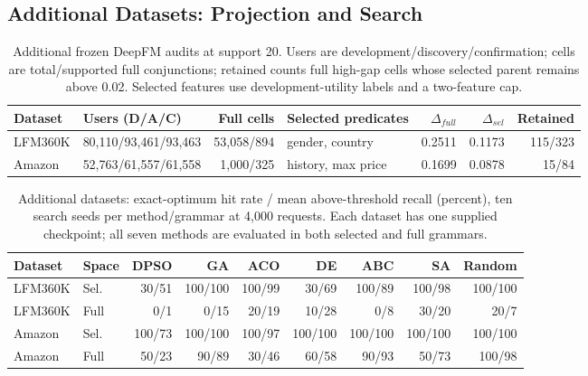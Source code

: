 \documentclass[sigconf,nonacm]{acmart}
\begin{document}
\subsection{Additional Datasets: Projection and Search}
\begin{table}[t]
\centering
\caption{Additional frozen DeepFM audits at support 20. Users are development/discovery/confirmation; cells are total/supported full conjunctions; retained counts full high-gap cells whose selected parent remains above 0.02. Selected features use development-utility labels and a two-feature cap.}
\label{tab:additional-datasets}
\small
\begin{tabular}{llrlrrr}
\toprule
Dataset & Users (D/A/C) & Full cells & Selected predicates & $\Delta_{full}$ & $\Delta_{sel}$ & Retained \\
\midrule
LFM360K & 80,110/93,461/93,463 & 53,058/894 & gender, country & 0.2511 & 0.1173 & 115/323 \\
Amazon & 52,763/61,557/61,558 & 1,000/325 & history, max price & 0.1699 & 0.0878 & 15/84 \\
\bottomrule
\end{tabular}
\end{table}

\begin{table}[t]
\centering
\caption{Additional datasets: exact-optimum hit rate / mean above-threshold recall (percent), ten search seeds per method/grammar at 4,000 requests. Each dataset has one supplied checkpoint; all seven methods are evaluated in both selected and full grammars.}
\label{tab:additional-search}
\small
\begin{tabular}{llrrrrrrr}
\toprule
Dataset & Space & DPSO & GA & ACO & DE & ABC & SA & Random \\
\midrule
LFM360K & Sel. & 30/51 & 100/100 & 100/99 & 30/69 & 100/89 & 100/98 & 100/100 \\
LFM360K & Full & 0/1 & 0/15 & 20/19 & 10/28 & 0/8 & 30/20 & 20/7 \\
Amazon & Sel. & 100/73 & 100/100 & 100/97 & 100/100 & 100/100 & 100/100 & 100/100 \\
Amazon & Full & 50/23 & 90/89 & 30/46 & 60/58 & 90/93 & 50/73 & 100/98 \\
\bottomrule
\end{tabular}
\end{table}
\end{document}
